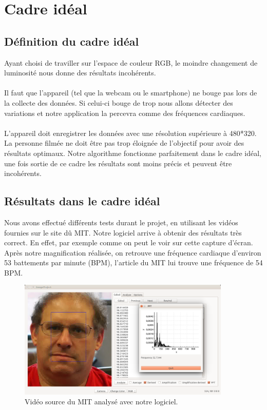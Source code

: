 \section{Cadre idéal}

\subsection{Définition du cadre idéal}
Ayant choisi de traviller sur l'espace de couleur RGB, le moindre changement de luminosité nous donne des résultats incohérents. \\\\
Il faut que l'appareil (tel que la webcam ou le smartphone) ne bouge pas lors de la collecte des données. Si celui-ci bouge de trop nous allons détecter des variations et notre application la percevra comme des fréquences cardiaques.\\\\
L'appareil doit enregistrer les données avec une résolution supérieure à 480*320.\\
La personne filmée ne doit être pas trop éloignée de l'objectif pour avoir des résultats optimaux.
Notre algorithme fonctionne parfaitement dans le cadre idéal, une fois sortie de ce cadre les résultats sont moins précis et peuvent être incohérents. \\

\subsection{Résultats dans le cadre idéal}
Nous avons effectué différents tests durant le projet, en utilisant les vidéos fournies sur le site dû MIT\@. Notre logiciel arrive à obtenir des
résultats très correct. En effet, par exemple comme on peut le voir sur cette capture d'écran. Après notre magnification réalisée, on retrouve
une fréquence cardiaque d'environ 53 battements par minute (BPM), l'article du MIT lui trouve une fréquence de 54 BPM\@.

\begin{figure}[h!]
	\centering
	\includegraphics[width=0.9\textwidth]{data/cas-ideal.png}
	\caption{Vidéo source du MIT analysé avec notre logiciel.}
\end{figure}


